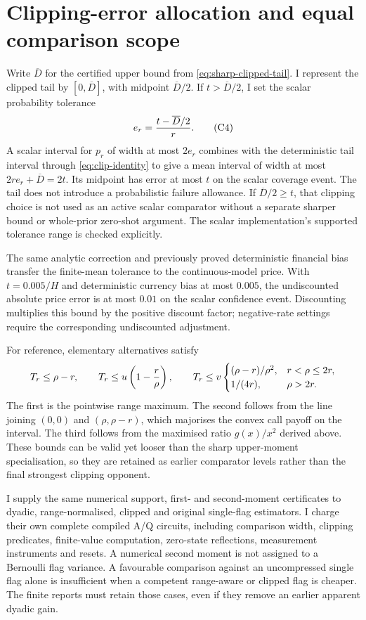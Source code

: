 \section{Clipping-error allocation and equal comparison scope}
\label{sec:clipping-financial-error}

Write \(\overline D\) for the certified upper bound from \eqref{eq:sharp-clipped-tail}. I represent the clipped tail by \([0,\overline D]\), with midpoint \(\overline D/2\). If \(t>\overline D/2\), I set the scalar probability tolerance
\[
 e_r={t-\overline D/2\over r}.
 \tag{C4}\label{eq:clipping-probability-tolerance}
\]
A scalar interval for \(p_r\) of width at most \(2e_r\) combines with the deterministic tail interval through \eqref{eq:clip-identity} to give a mean interval of width at most
\(2re_r+\overline D=2t\). Its midpoint has error at most \(t\) on the scalar coverage event. The tail does not introduce a probabilistic failure allowance. If \(\overline D/2\geq t\), that clipping choice is not used as an active scalar comparator without a separate sharper bound or whole-prior zero-shot argument. The scalar implementation's supported tolerance range is checked explicitly.

The same analytic correction and previously proved deterministic financial bias transfer the finite-mean tolerance to the continuous-model price. With \(t=0.005/H\) and deterministic currency bias at most \(0.005\), the undiscounted absolute price error is at most \(0.01\) on the scalar confidence event. Discounting multiplies this bound by the positive discount factor; negative-rate settings require the corresponding undiscounted adjustment.

For reference, elementary alternatives satisfy
\[
 T_r\leq\rho-r,\qquad
 T_r\leq u\left(1-{r\over\rho}\right),\qquad
 T_r\leq v\begin{cases}
 (\rho-r)/\rho^2,&r<\rho\leq2r,\\
 1/(4r),&\rho>2r.
 \end{cases}
\]
The first is the pointwise range maximum. The second follows from the line joining \((0,0)\) and \((\rho,\rho-r)\), which majorises the convex call payoff on the interval. The third follows from the maximised ratio \(g(x)/x^2\) derived above. These bounds can be valid yet looser than the sharp upper-moment specialisation, so they are retained as earlier comparator levels rather than the final strongest clipping opponent.

I supply the same numerical support, first- and second-moment certificates to dyadic, range-normalised, clipped and original single-flag estimators. I charge their own complete compiled A/Q circuits, including comparison width, clipping predicates, finite-value computation, zero-state reflections, measurement instruments and resets. A numerical second moment is not assigned to a Bernoulli flag variance. A favourable comparison against an uncompressed single flag alone is insufficient when a competent range-aware or clipped flag is cheaper. The finite reports must retain those cases, even if they remove an earlier apparent dyadic gain.
